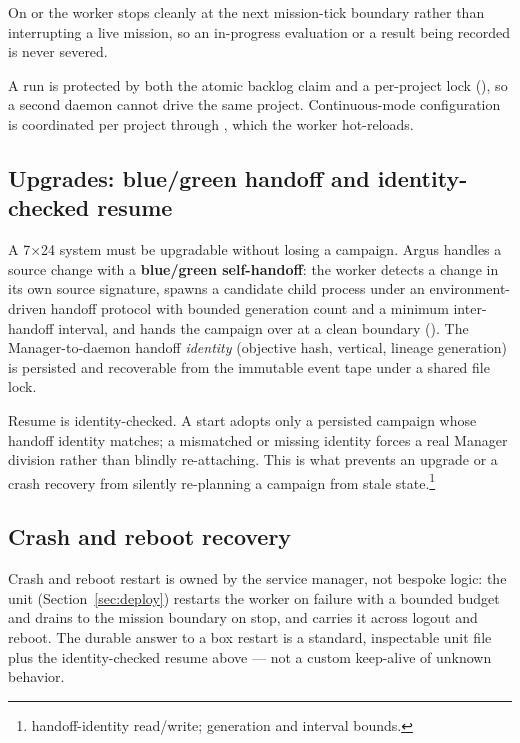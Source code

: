 \begin{description}[leftmargin=1.4em, style=nextline]
  \item[Drain to the mission boundary.] On  or  the
    worker stops cleanly at the next mission-tick boundary rather than
    interrupting a live mission, so an in-progress evaluation or a result being
    recorded is never severed.
  \item[Two-layer concurrency guard.] A run is protected by both the atomic
    backlog claim and a per-project  lock
    (), so a second daemon cannot drive the same
    project. Continuous-mode configuration is coordinated per project through
    , which the worker hot-reloads.
\end{description}

\subsection{Upgrades: blue/green handoff and identity-checked resume}

A 7$\times$24 system must be upgradable without losing a campaign. Argus handles a
source change with a \textbf{blue/green self-handoff}: the worker detects a change
in its own source signature, spawns a candidate child process under an
environment-driven handoff protocol with bounded generation count and a minimum
inter-handoff interval, and hands the campaign over at a clean boundary
(). The Manager-to-daemon handoff \emph{identity}
(objective hash, vertical, lineage generation) is persisted and recoverable from
the immutable event tape under a shared file lock.

Resume is identity-checked. A  start adopts only a
persisted campaign whose handoff identity matches; a mismatched or missing
identity forces a real Manager division rather than blindly re-attaching. This is
what prevents an upgrade or a crash recovery from silently re-planning a campaign
from stale state.\footnote{ handoff-identity
read/write;  generation and interval bounds.}

\subsection{Crash and reboot recovery}

Crash and reboot restart is owned by the service manager, not bespoke logic: the
 unit (Section~\ref{sec:deploy}) restarts the worker on
failure with a bounded budget and drains to the mission boundary on stop, and
 carries it across logout and reboot. The durable
answer to a box restart is a standard, inspectable unit file plus the
identity-checked resume above --- not a custom keep-alive of unknown behavior.
